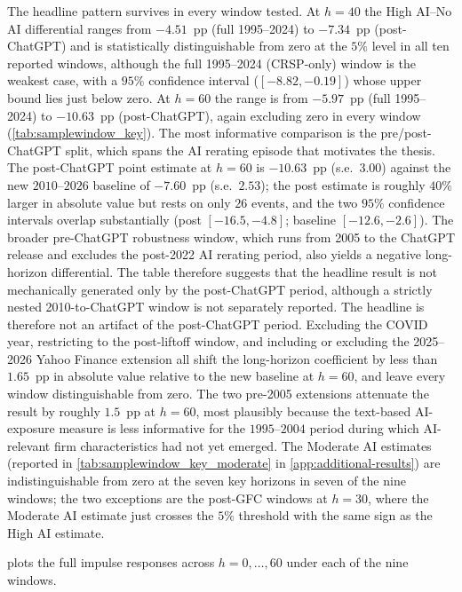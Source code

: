 The headline pattern survives in every window tested. At $h = 40$
the High AI--No AI differential ranges from $-4.51$~pp (full
1995--2024) to $-7.34$~pp (post-ChatGPT) and is statistically
distinguishable from zero at the $5\%$ level in all ten reported
windows, although the full 1995--2024 (CRSP-only) window is the
weakest case, with a $95\%$ confidence interval ($[-8.82, -0.19]$)
whose upper bound lies just below zero. At
$h = 60$ the range is from $-5.97$~pp (full 1995--2024) to
$-10.63$~pp (post-ChatGPT), again excluding zero in every window
(\cref{tab:samplewindow_key}). The most informative comparison is
the pre/post-ChatGPT split, which spans the AI rerating episode
that motivates the thesis. The post-ChatGPT point estimate at
$h = 60$ is $-10.63$~pp (s.e.~$3.00$) against the new $2010$--$2026$
baseline of $-7.60$~pp (s.e.~$2.53$); the post estimate is roughly
$40\%$ larger in absolute value but rests on only $26$ events, and
the two $95\%$ confidence intervals overlap substantially (post
$[-16.5, -4.8]$; baseline $[-12.6, -2.6]$). The broader pre-ChatGPT robustness window, which runs from 2005 to
the ChatGPT release and excludes the post-2022 AI rerating period,
also yields a negative long-horizon differential. The table
therefore suggests that the headline result is not mechanically
generated only by the post-ChatGPT period, although a strictly
nested 2010-to-ChatGPT window is not separately reported.
The headline is therefore not an artifact of the post-ChatGPT
period. Excluding the COVID year, restricting to
the post-liftoff window, and including or excluding the
2025--2026 Yahoo Finance extension all shift the long-horizon
coefficient by less than $1.65$~pp in absolute value relative to
the new baseline at $h = 60$, and leave every window
distinguishable from zero. The two pre-2005 extensions
attenuate the result by roughly $1.5$~pp at $h = 60$, most plausibly
because the text-based AI-exposure measure is less informative for
the $1995$--$2004$ period during which AI-relevant firm
characteristics had not yet emerged. The Moderate AI estimates
(reported in \cref{tab:samplewindow_key_moderate} in
\cref{app:additional-results}) are indistinguishable from zero at the
seven key horizons in seven of the nine windows; the two exceptions
are the post-GFC windows at $h = 30$, where the Moderate AI estimate
just crosses the $5\%$ threshold with the same sign as the High AI
estimate.

 plots the full impulse responses across
$h = 0,\ldots,60$ under each of the nine windows.

